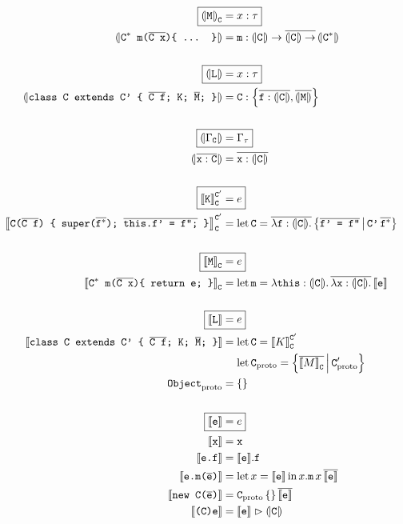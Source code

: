 \begin{align*}    
    \Aboxed{\denoty{\fj M}_{\fj C} &= x : \tau} \\
    \denoty{\fjmethdefx} &= \fj m : \denoty{\fj C} \to \overline{\denoty{\fj C} \to}\, \denoty{\fj{C}^*} \\
    \\
    \Aboxed{\denoty{\fj L} &= x : \tau} \\
    \denoty{\fjclassdef} &= \fj C : \flrec{\overline{\fj{f}: \denoty{\fj{C}}}, \overline{\denoty{\fj M}}} \\
    \\
    \Aboxed{\denoty{\Gamma_{\fj C}} &= \Gamma_\tau} \\
    \denoty{\overline{\fj x : \fj C}} &= \overline{\fj x : \denoty{\fj C}} \\
    \\
    \Aboxed{\denot{\fj K}_{\fj{C}}^{\fj{C}'} &= e} \\
    \denot{\fjconsdef}_{\fj{C}}^{\fj{C}'} &= \flletx{\fj C}{\overline{\fllam{\fj f : \denoty{\fj C}}}\, \flext{\fj{\fjoverline{f' = f''}}}{\fj{C'}\,\overline{\fj{f}^*}}}
    \\ \\
    \Aboxed{\denot{\fj M}_{\fj C} &= e} \\
    \denot{\fjmethdef}_{\fj C} &= \flletx{\fj m}{\fllam{\fj{this} : \denoty{\fj C}} \overline{\fllam{\fj x: \denoty{\fj C}}}\, \denot{\fj e}}
    \\ \\
    \Aboxed{\denot{\fj L} &= e} \\
    \denot{\fjclassdef} &= \flletx{\fj C}{\denot{K}_{\fj C}^{\fj C'}} \\
    &\phantom{{}={}} \flletx{\fj{C}_\mathrm{proto}}{\flext{\overline{\denot{M}_{\fj C}}}{\fj C'_\mathrm{proto}}} \\
    \fj{Object}_\mathrm{proto} &= \flrec{}
    \\ \\
    \Aboxed{\denot{\fj e} &= e} \\
    \denot{\fj x} &= \fj x \\
    \denot{\fj {e.f}} &= \flproj{\denot{\fj e}}{\fj f} \\
    \denot{\fj {e.m(\fjoverline e)}} &= \fllet{x}{\denot{\fj e}} \flproj{x}{\fj m}\,x\,\overline{\denot{\fj e}} \\
    \denot{\fj {new C(\fjoverline e)}} &= \fj{C}_\mathrm{proto}\,\flrec{}\,\overline{\denot{\fj e}} \\
    \denot{\fj {(C)e}} &= \flcast{\denot {\fj e}}{\denoty {\fj C}} \\ 
    \centredalign
\end{align*}